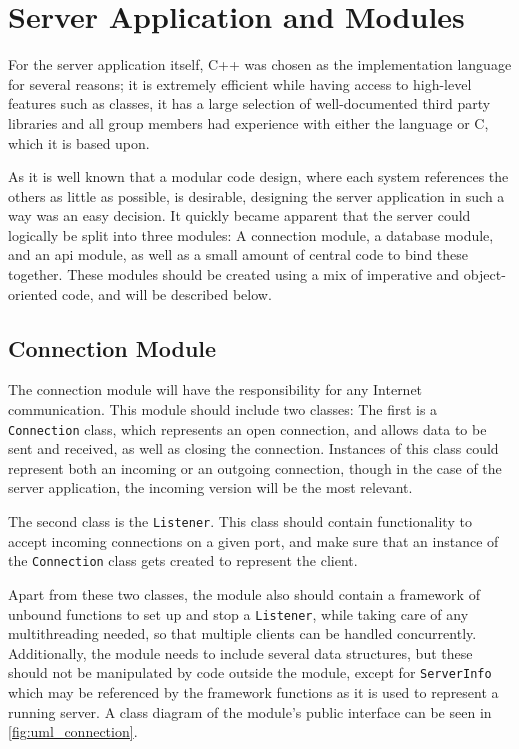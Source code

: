 \section{Server Application and Modules}

For the server application itself, C++ was chosen as the implementation language for several reasons; it is extremely efficient while having access to high-level
features such as classes, it has a large selection of well-documented third party libraries and all group members had experience with either the language or C, which it
is based upon.

As it is well known that a modular code design, where each system references the others as little as possible, is desirable, designing the server application in such a way
was an easy decision. It quickly became apparent that the server could logically be split into three modules: A connection module, a database module, and an \ac{api} module,
as well as a small amount of central code to bind these together. These modules should be created using a mix of imperative and object-oriented code, and will be described below.

\subsection{Connection Module}

The connection module will have the responsibility for any Internet communication. This module should include two classes: The first is a \lstinline|Connection| class,
which represents an open connection, and allows data to be sent and received, as well as closing the connection. Instances of this class could represent both an incoming or an outgoing
connection, though in the case of the server application, the incoming version will be the most relevant.

The second class is the \lstinline|Listener|. This class should contain functionality to accept incoming connections on a given port, and make sure that an instance of the \lstinline|Connection| class gets created
to represent the client.

Apart from these two classes, the module also should contain a framework of unbound functions to set up and stop a \lstinline|Listener|, while taking care of any multithreading needed, so that multiple
clients can be handled concurrently. Additionally, the module needs to include several data structures, but these should not be manipulated by code outside the module, except for \lstinline|ServerInfo|
which may be referenced by the framework functions as it is used to represent a running server. A class diagram of the module's public interface can be seen in \autoref{fig:uml_connection}. 

